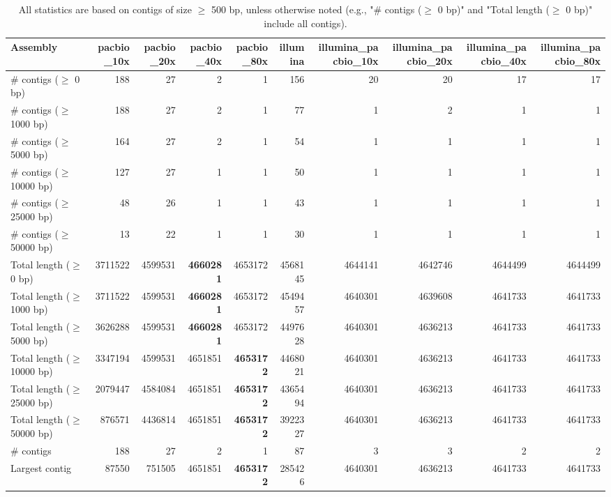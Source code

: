 \documentclass[12pt,a4paper]{article}
\begin{document}
\begin{table}[ht]
\begin{center}
\caption{All statistics are based on contigs of size $\geq$ 500 bp, unless otherwise noted (e.g., "\# contigs ($\geq$ 0 bp)" and "Total length ($\geq$ 0 bp)" include all contigs).}
\begin{tabular}{|l*{9}{|r}|}
\hline
Assembly & pacbio\_10x & pacbio\_20x & pacbio\_40x & pacbio\_80x & illumina & illumina\_pacbio\_10x & illumina\_pacbio\_20x & illumina\_pacbio\_40x & illumina\_pacbio\_80x \\ \hline
\# contigs ($\geq$ 0 bp) & 188 & 27 & 2 & 1 & 156 & 20 & 20 & 17 & 17 \\ \hline
\# contigs ($\geq$ 1000 bp) & 188 & 27 & 2 & 1 & 77 & 1 & 2 & 1 & 1 \\ \hline
\# contigs ($\geq$ 5000 bp) & 164 & 27 & 2 & 1 & 54 & 1 & 1 & 1 & 1 \\ \hline
\# contigs ($\geq$ 10000 bp) & 127 & 27 & 1 & 1 & 50 & 1 & 1 & 1 & 1 \\ \hline
\# contigs ($\geq$ 25000 bp) & 48 & 26 & 1 & 1 & 43 & 1 & 1 & 1 & 1 \\ \hline
\# contigs ($\geq$ 50000 bp) & 13 & 22 & 1 & 1 & 30 & 1 & 1 & 1 & 1 \\ \hline
Total length ($\geq$ 0 bp) & 3711522 & 4599531 & {\bf 4660281} & 4653172 & 4568145 & 4644141 & 4642746 & 4644499 & 4644499 \\ \hline
Total length ($\geq$ 1000 bp) & 3711522 & 4599531 & {\bf 4660281} & 4653172 & 4549457 & 4640301 & 4639608 & 4641733 & 4641733 \\ \hline
Total length ($\geq$ 5000 bp) & 3626288 & 4599531 & {\bf 4660281} & 4653172 & 4497628 & 4640301 & 4636213 & 4641733 & 4641733 \\ \hline
Total length ($\geq$ 10000 bp) & 3347194 & 4599531 & 4651851 & {\bf 4653172} & 4468021 & 4640301 & 4636213 & 4641733 & 4641733 \\ \hline
Total length ($\geq$ 25000 bp) & 2079447 & 4584084 & 4651851 & {\bf 4653172} & 4365494 & 4640301 & 4636213 & 4641733 & 4641733 \\ \hline
Total length ($\geq$ 50000 bp) & 876571 & 4436814 & 4651851 & {\bf 4653172} & 3922327 & 4640301 & 4636213 & 4641733 & 4641733 \\ \hline
\# contigs & 188 & 27 & 2 & 1 & 87 & 3 & 3 & 2 & 2 \\ \hline
Largest contig & 87550 & 751505 & 4651851 & {\bf 4653172} & 285426 & 4640301 & 4636213 & 4641733 & 4641733 \\ \hline

\end{tabular}
\end{center}
\end{table}
\end{document}
